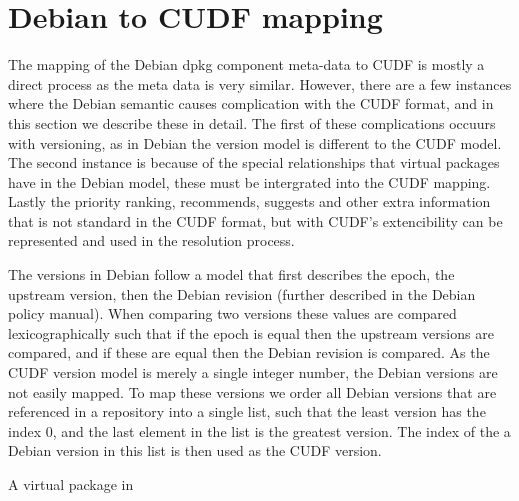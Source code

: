 \section{Debian to CUDF mapping}
The mapping of the Debian dpkg component meta-data to CUDF is mostly a direct process as the meta data is very similar. 
However, there are a few instances where the Debian semantic causes complication with the CUDF format, and in this section we describe these in detail.
The first of these complications occuurs with versioning, as in Debian the version model is different to the CUDF model.
The second instance is because of the special relationships that virtual packages have in the Debian model, 
these must be intergrated into the CUDF mapping. 
Lastly the priority ranking, recommends, suggests and other extra information that is not standard in the CUDF format,
but with CUDF's extencibility can be represented and used in the resolution process.

The versions in Debian follow a model that first describes the epoch,
the upstream version, then the Debian revision (further described in the Debian policy manual). %
When comparing two versions these values are compared lexicographically such that
if the epoch is equal then the upstream versions are compared, 
and if these are equal then the Debian revision is compared.
As the CUDF version model is merely a single integer number, 
the Debian versions are not easily mapped.
To map these versions we order all Debian versions that are referenced in a repository into a single list, 
such that the least version has the index 0, and the last element in the list is the greatest version.
The index of the a Debian version in this list is then used as the CUDF version.

A virtual package in


